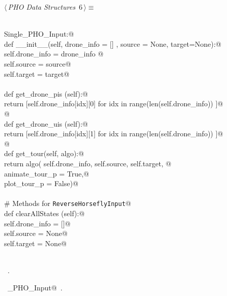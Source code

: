 \documentclass[10.0pt]{report}
\begin{document}
\begin{flushleft} \small\label{scrap1}\raggedright\small
{} $\langle\,${\itshape PHO Data Structures}\nobreak\ {\footnotesize {6}}$\,\rangle\equiv$
\vspace{-1ex}
\begin{list}{}{} \item
\mbox{}\verb@@\\
\mbox{}\verb@class Single_PHO_Input:@\\
\mbox{}\verb@    def __init__(self, drone_info = [] , source = None, target=None):@\\
\mbox{}\verb@           self.drone_info = drone_info @\\
\mbox{}\verb@           self.source     = source@\\
\mbox{}\verb@           self.target     = target@\\
\mbox{}\verb@@\\
\mbox{}\verb@    def get_drone_pis (self):@\\
\mbox{}\verb@           return [self.drone_info[idx][0] for idx in range(len(self.drone_info)) ]@\\
\mbox{}\verb@           @\\
\mbox{}\verb@    def get_drone_uis (self):@\\
\mbox{}\verb@           return [self.drone_info[idx][1] for idx in range(len(self.drone_info)) ]@\\
\mbox{}\verb@         @\\
\mbox{}\verb@    def get_tour(self, algo):@\\
\mbox{}\verb@           return algo( self.drone_info, self.source, self.target, @\\
\mbox{}\verb@                        animate_tour_p = True,@\\
\mbox{}\verb@                        plot_tour_p    = False)@\\
\mbox{}\verb@@\\
\mbox{}\verb@    # Methods for \verb|ReverseHorseflyInput|@\\
\mbox{}\verb@    def clearAllStates (self):@\\
\mbox{}\verb@          self.drone_info = []@\\
\mbox{}\verb@          self.source = None@\\
\mbox{}\verb@          self.target = None@\\
\mbox{}\verb@@\\
\mbox{}\verb@@{\NWsep}
\end{list}
\vspace{-1.5ex}
\footnotesize
\begin{list}{}{\setlength{\itemsep}{-\parsep}\setlength{\itemindent}{-\leftmargin}}
\item \NWtxtMacroRefIn\ .
\item \NWtxtIdentsDefed\nobreak\  \verb@Single_PHO_Input@\nobreak\ .
\item{}
\end{list}
\vspace{4ex}
\end{flushleft}
\end{document}
